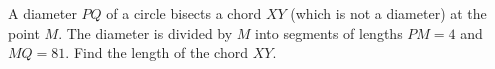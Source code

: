 A diameter $PQ$ of a circle bisects a chord $XY$ (which is not a diameter) at the point $M$. The diameter is divided by $M$ into segments of lengths $PM=4$ and $MQ=81$. Find the length of the chord $XY$.
